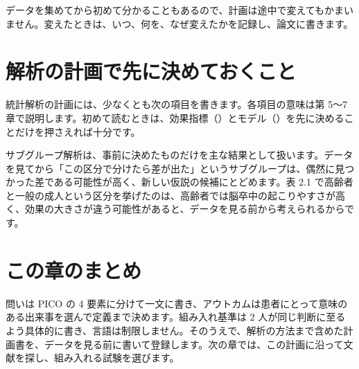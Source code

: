 データを集めてから初めて分かることもあるので、計画は途中で変えてもかまいません。変えたときは、いつ、何を、なぜ変えたかを記録し、論文に書きます。

\section{解析の計画で先に決めておくこと}
\label{sec:02-5}

統計解析の計画には、少なくとも次の項目を書きます。各項目の意味は第 5〜7 章で説明します。初めて読むときは、効果指標（）とモデル（）を先に決めることだけを押さえれば十分です。

\begin{kkcenter}
\end{kkcenter}

サブグループ解析は、事前に決めたものだけを主な結果として扱います。データを見てから「この区分で分けたら差が出た」というサブグループは、偶然に見つかった差である可能性が高く、新しい仮説の候補にとどめます。表 2.1 で高齢者と一般の成人という区分を挙げたのは、高齢者では脳卒中の起こりやすさが高く、効果の大きさが違う可能性があると、データを見る前から考えられるからです。

\section{この章のまとめ}
\label{sec:02-6}

問いは PICO の 4 要素に分けて一文に書き、アウトカムは患者にとって意味のある出来事を選んで定義まで決めます。組み入れ基準は 2 人が同じ判断に至るよう具体的に書き、言語は制限しません。そのうえで、解析の方法まで含めた計画書を、データを見る前に書いて登録します。次の章では、この計画に沿って文献を探し、組み入れる試験を選びます。
